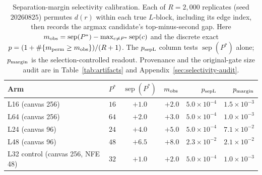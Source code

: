 \documentclass{article}
\begin{document}
\FloatBarrier
\begin{table}[H]
\centering
\footnotesize
\setlength{\tabcolsep}{3.2pt}
\begin{tabular}{@{}lccrrr@{}}
\toprule
Arm & $P^*$ & $\operatorname{sep}(P^*)$ & $m_{\rm obs}$ & $p_{\rm sepL}$ & $p_{\rm margin}$ \\
\midrule
L16 (canvas 256) & $16$ & $+1.0$ & $+2.0$ & $5.0\times10^{-4}$ & $1.5\times10^{-3}$ \\
L64 (canvas 256) & $64$ & $+2.0$ & $+3.0$ & $5.0\times10^{-4}$ & $1.0\times10^{-3}$ \\
L24 (canvas 96) & $24$ & $+4.0$ & $+5.0$ & $5.0\times10^{-4}$ & $7.1\times10^{-2}$ \\
L48 (canvas 96) & $48$ & $+6.5$ & $+8.0$ & $2.3\times10^{-2}$ & $2.1\times10^{-2}$ \\
L32 control (canvas 256, NFE 48) & $32$ & $+1.0$ & $+2.0$ & $5.0\times10^{-4}$ & $1.0\times10^{-3}$ \\
\bottomrule
\end{tabular}
\caption{Separation-margin selectivity calibration. Each of $R{=}2{,}000$
replicates (seed $20260825$) permutes $d(r)$ within each true $L$-block,
including its edge index, then records the argmax candidate's top-minus-second
gap. Here $m_{\rm obs}=\operatorname{sep}(P^*)-
\max_{c\ne P^*}\operatorname{sep}(c)$ and the discrete exact
$p=(1+\#\{m_{\rm perm}\ge m_{\rm obs}\})/(R+1)$. The $p_{\rm sepL}$ column
tests $\operatorname{sep}(P^*)$ alone; $p_{\rm margin}$ is the
selection-controlled readout. Provenance and the original-gate size audit are
in Table~\ref{tab:artifacts} and Appendix~\ref{sec:selectivity-audit}.}
\label{tab:sep-null}
\end{table}
\end{document}
